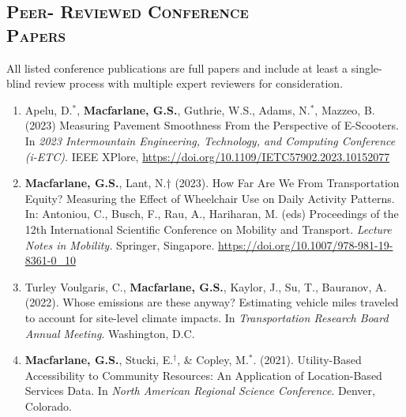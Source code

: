 \documentclass[margin,line]{res}
\newif\ifdetail
\newcounter{enuminitialize}
\newenvironment{myenum}[1][]
{%
 \setcounter{enuminitialize}{#1}
 \addtocounter{enuminitialize}{2}
 \begin{enumerate}[left= 4pt, itemsep=12pt, start=\value{enuminitialize}, label=\arabic*\addtocounter{enumi}{-2}]
}
{%
 \end{enumerate}
}
\newcommand{\secfont}{\scshape }
\begin{document}
\begin{resume}

\noindent\makebox[\linewidth]{\rule{\linewidth}{0.4pt}}
\section{\secfont Peer- Reviewed Conference \\ Papers}
All listed conference publications are full papers and include at least a
single-blind review process with multiple expert reviewers for consideration.
\ifdetail Papers 1 and 2 resulted from my undergraduate honors thesis, papers 3 through 5
resulted from my doctoral work, and items since item 6 represent work completed since joining the faculty at BYU.\fi
\vspace{.3cm}
\begin{myenum}[10]

\item Apelu, D.$^*$, \textbf{Macfarlane, G.S.}, Guthrie, W.S., Adams, N.$^*$, Mazzeo, B. (2023) Measuring Pavement Smoothness From the Perspective of E-Scooters. In \textit{2023 Intermountain Engineering, Technology, and Computing Conference (i-ETC)}. IEEE XPlore, \url{https://doi.org/10.1109/IETC57902.2023.10152077}

\item \textbf{Macfarlane, G.S.}, Lant, N.$\dagger$ (2023). How Far Are We From Transportation Equity? Measuring the Effect of Wheelchair Use on Daily Activity Patterns. In: Antoniou, C., Busch, F., Rau, A., Hariharan, M. (eds) Proceedings of the 12th International Scientific Conference on Mobility and Transport. \textit{Lecture Notes in Mobility.} Springer, Singapore. \url{https://doi.org/10.1007/978-981-19-8361-0_10}

\item Turley Voulgaris, C., \textbf{Macfarlane, G.S.}, Kaylor, J., Su, T., Bauranov, A. (2022). Whose emissions are these anyway? Estimating vehicle miles traveled to account for site-level climate impacts. In \textit{Transportation Research Board Annual Meeting}. Washington, D.C.

\item \textbf{Macfarlane, G.S.}, Stucki,  E.$^\dagger$,  \& Copley, M.$^*$. (2021). Utility-Based Accessibility to Community Resources: An Application of Location-Based Services Data. In \textit{North American Regional Science Conference}. Denver, Colorado.


\end{myenum}
\end{resume}
\end{document}
